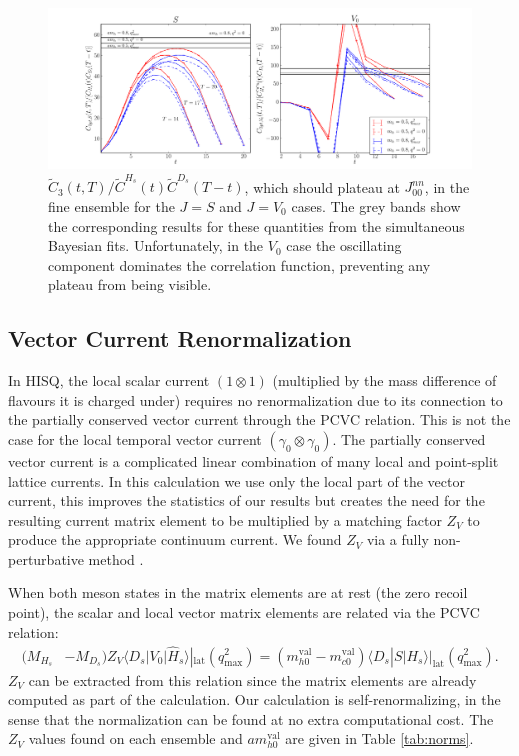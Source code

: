 \begin{figure}[htb!]
    \hspace{-60pt}
    \includegraphics[width=1.3\textwidth]{images/BsDs/fine_3pt_summary.pdf}
    \caption{$\tilde{C}_3(t,T)/\tilde{C}^{H_s}(t) \tilde{C}^{D_s}(T-t)$, which should plateau at $J_{00}^{nn}$, in the fine ensemble for the $J=S$ and $J=V_0$ cases. The grey bands show the corresponding results for these quantities from the simultaneous Bayesian fits. Unfortunately, in the $V_0$ case the oscillating component dominates the correlation function, preventing any plateau from being visible. \label{fig:3ptcorrs_BsDs}}
\end{figure}

\subsection{Vector Current Renormalization}

In HISQ, the local scalar current $(1\otimes 1)$ (multiplied by the mass difference of flavours it is charged under) requires no renormalization due to its connection to the partially conserved vector current through the PCVC relation. This is not the case for the local temporal vector current $(\gamma_0\otimes \gamma_0)$. The partially conserved vector current is a complicated linear combination of many local and point-split lattice currents. In this calculation we use only the local part of the vector current, this improves the statistics of our results but creates the need for the resulting current matrix element to be multiplied by a matching factor $Z_V$ to produce the appropriate continuum current. We found $Z_V$ via a fully non-perturbative method \cite{Koponen:2013tua}.

When both meson states in the matrix elements are at rest (the zero recoil point), the scalar and local vector matrix elements are related via the PCVC relation:
\begin{align}
  ( M_{H_s}& - M_{D_s} ) Z_V \langle D_s | V_0 | \hat{H}_s \rangle|_{\text{lat}}(q^2_{\text{max}}) = (m^{\text{val}}_{h0} - m^{\text{val}}_{c0}) \langle D_s | S | H_s \rangle|_{\text{lat}}(q^2_{\text{max}}).
  \label{eq:ward}
\end{align}
$Z_V$ can be extracted from this relation since the matrix elements are already computed as part of the calculation. Our calculation is self-renormalizing, in the sense that the normalization can be found at no extra computational cost. The $Z_V$ values found on each ensemble and $am^{\text{val}}_{h0}$ are given in Table \ref{tab:norms}.

